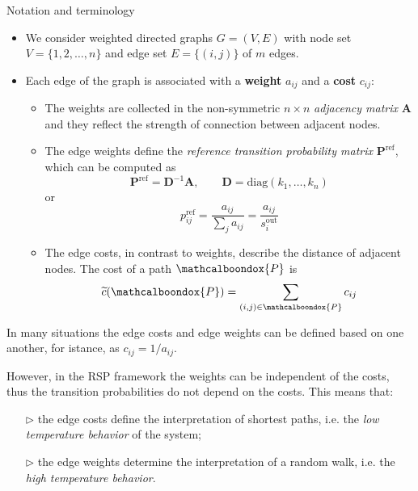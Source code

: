 \documentclass[13pt]{beamer}
\newcommand{\bondox}{\mathcalboondox}
\begin{document}
    \begin{frame}[t,allowframebreaks]{Notation and terminology}

        \begin{itemize}
            \item  We consider weighted directed graphs $G=(V,E)$ with node set $V=\{1,2,\dots,n\}$ and edge set $E=\{(i,j)\}$ of $m$ edges.

            \item Each edge of the graph is associated with a \textbf{weight} $a_{ij}$ and a \textbf{cost} $c_{ij}$:

            \begin{itemize}
                \item The weights are collected in the non-symmetric $n\times n$ \emph{adjacency matrix} $\mathbf{A}$ and they reflect the strength of connection between adjacent nodes.

                \item The edge weights define the \emph{reference transition probability matrix} $\mathbf{P}^{\text{ref}}$, which can be computed as
                \begin{equation*}
                \mathbf{P}^{\text{ref}}=\mathbf{D}^{-1}\mathbf{A},\qquad\mathbf{D}=\text{diag}(k_1,\dots,k_n)
                \end{equation*}
                or
                \begin{equation*}
                p^{\text{ref}}_{ij} = \frac{a_{ij}}{\sum_{j} a_{ij}} = \frac{a_{ij}}{s_i^{\text{out}}}
                \end{equation*}

                \item The edge costs, in contrast to weights, describe the distance of adjacent nodes. The cost of a path $\bondox{P}$ is
                \begin{equation*}
                \widetilde{c}(\bondox{P})=\sum_{(i,j)\in\bondox{P}} c_{ij}
                \end{equation*}
            \end{itemize}

        \end{itemize}

        In many situations the edge costs and edge weights can be defined based on one another, for istance, as $c_{ij}=1/a_{ij}$. 

        However, in the RSP framework the weights can be independent of the costs, thus the transition probabilities do not depend on the costs. This means that:

        \begin{itemize}
            \item[$\triangleright$] the edge costs define the interpretation of shortest paths, i.e. the \emph{low temperature behavior} of the system;

            \item[$\triangleright$] the edge weights determine the interpretation of a random walk, i.e. the \emph{high temperature behavior}.
        \end{itemize}

    \end{frame}
\end{document}
